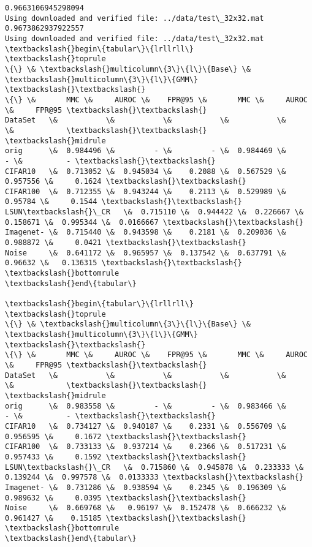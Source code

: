 \documentclass[11pt]{article}
\begin{document}
    \begin{Verbatim}[commandchars=\\\{\}]
0.9663106945298094
Using downloaded and verified file: ../data/test\_32x32.mat
0.9673862937922557
Using downloaded and verified file: ../data/test\_32x32.mat
\textbackslash{}begin\{tabular\}\{lrllrll\}
\textbackslash{}toprule
\{\} \& \textbackslash{}multicolumn\{3\}\{l\}\{Base\} \& \textbackslash{}multicolumn\{3\}\{l\}\{GMM\} \textbackslash{}\textbackslash{}
\{\} \&       MMC \&     AUROC \&    FPR@95 \&       MMC \&     AUROC \&     FPR@95 \textbackslash{}\textbackslash{}
DataSet   \&           \&           \&           \&           \&           \&            \textbackslash{}\textbackslash{}
\textbackslash{}midrule
orig      \&  0.984496 \&         - \&         - \&  0.984469 \&         - \&          - \textbackslash{}\textbackslash{}
CIFAR10   \&  0.713052 \&  0.945034 \&    0.2088 \&  0.567529 \&  0.957556 \&     0.1624 \textbackslash{}\textbackslash{}
CIFAR100  \&  0.712355 \&  0.943244 \&    0.2113 \&  0.529989 \&   0.95784 \&     0.1544 \textbackslash{}\textbackslash{}
LSUN\textbackslash{}\_CR   \&  0.715110 \&  0.944422 \&  0.226667 \&  0.158671 \&  0.995344 \&  0.0166667 \textbackslash{}\textbackslash{}
Imagenet- \&  0.715440 \&  0.943598 \&    0.2181 \&  0.209036 \&  0.988872 \&     0.0421 \textbackslash{}\textbackslash{}
Noise     \&  0.641172 \&  0.965957 \&  0.137542 \&  0.637791 \&   0.96632 \&   0.136315 \textbackslash{}\textbackslash{}
\textbackslash{}bottomrule
\textbackslash{}end\{tabular\}

\textbackslash{}begin\{tabular\}\{lrllrll\}
\textbackslash{}toprule
\{\} \& \textbackslash{}multicolumn\{3\}\{l\}\{Base\} \& \textbackslash{}multicolumn\{3\}\{l\}\{GMM\} \textbackslash{}\textbackslash{}
\{\} \&       MMC \&     AUROC \&    FPR@95 \&       MMC \&     AUROC \&     FPR@95 \textbackslash{}\textbackslash{}
DataSet   \&           \&           \&           \&           \&           \&            \textbackslash{}\textbackslash{}
\textbackslash{}midrule
orig      \&  0.983558 \&         - \&         - \&  0.983466 \&         - \&          - \textbackslash{}\textbackslash{}
CIFAR10   \&  0.734127 \&  0.940187 \&    0.2331 \&  0.556709 \&  0.956595 \&     0.1672 \textbackslash{}\textbackslash{}
CIFAR100  \&  0.733133 \&  0.937214 \&    0.2366 \&  0.517231 \&  0.957433 \&     0.1592 \textbackslash{}\textbackslash{}
LSUN\textbackslash{}\_CR   \&  0.715860 \&  0.945878 \&  0.233333 \&  0.139244 \&  0.997578 \&  0.0133333 \textbackslash{}\textbackslash{}
Imagenet- \&  0.731286 \&  0.938594 \&    0.2345 \&  0.196309 \&  0.989632 \&     0.0395 \textbackslash{}\textbackslash{}
Noise     \&  0.669768 \&   0.96197 \&  0.152478 \&  0.666232 \&  0.961427 \&    0.15185 \textbackslash{}\textbackslash{}
\textbackslash{}bottomrule
\textbackslash{}end\{tabular\}


    \end{Verbatim}
\end{document}
